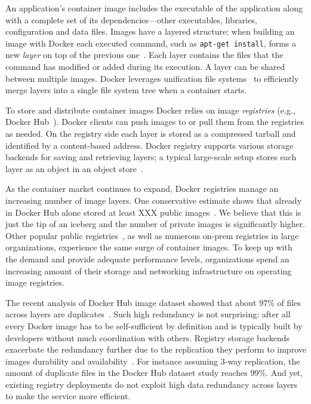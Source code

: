 An application's container image includes the executable of the application
along with a complete set of its dependencies---other executables, libraries,
configuration and data files.
%
Images have a layered structure; when building an image with Docker each
executed command, such as \texttt{apt-get install}, forms a new \emph{layer} on
top of the previous one~\cite{dockerfile}.
%
Each layer contains the files that the command has modified or added during its
execution.
%
A layer can be shared between multiple images.
%
Docker leverages unification file systems~\cite{docker-driver-eval} to
efficiently merge layers into a single file system tree when a container
starts.

To store and distribute container images Docker relies on image
\emph{registries} (e.g., Docker Hub~\cite{docker-hub}).
%
Docker clients can push images to or pull them from the registries as needed.
%
On the registry side each layer is stored as a compressed tarball and
identified by a content-based address.
%
Docker registry supports various storage backends for saving and retrieving
layers; a typical large-scale setup stores each layer as an object in an object
store~\cite{s3,swift}.

As the container market continues to expand, Docker registries
manage an increasing number of image layers.
%
One conservative estimate shows that already in  Docker Hub alone
stored at least XXX public images~. 
%
We believe that this is just the tip of an iceberg and the number of private
images is significantly higher.
%
Other popular public registries~, as well as numerous on-prem
registries in large organizations, experience the same surge of
container images.
%
To keep up with the demand and provide adequate performance levels,
organizations spend an increasing amount of their storage and
networking infrastructure on operating image registries.
%
%


The recent analysis of
Docker Hub image dataset showed that about $97$\% of files across layers are
duplicates~\cite{dedupanalysis}.
%
Such high redundancy is not surprising: after all every Docker image has to be
self-sufficient by definition and is typically built by developers without much
coordination with others.
%
Registry storage backends exacerbate the redundancy further due to the
replication they perform to improve images durability and
availability~\cite{Bonvin:2010:SFS:1807128.1807162}.
%
For instance assuming 3-way replication, the amount of duplicate files in the
Docker Hub dataset study reaches 99\%.
%
And yet, existing registry deployments do not exploit high data redundancy
across layers to make the service more efficient.

